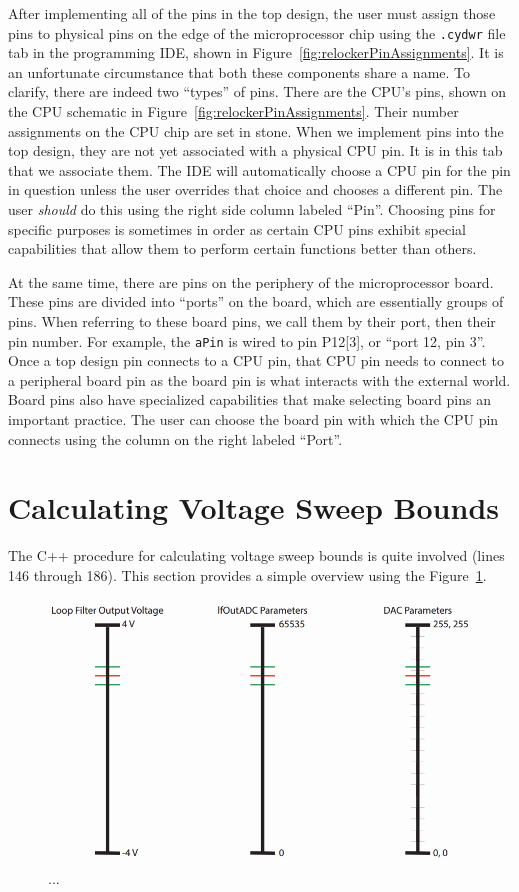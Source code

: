 \documentclass[10pt]{report}
\newcommand{\aPin}[0] {\texttt{aPin}}
\begin{document}
After implementing all of the pins in the top design, the user must assign those pins to physical pins on the edge of the microprocessor chip using the \texttt{.cydwr} file tab in the programming IDE, shown in Figure~\ref{fig:relockerPinAssignments}. It is an unfortunate circumstance that both these components share a name. To clarify, there are indeed two ``types'' of pins. There are the CPU's pins, shown on the CPU schematic in Figure~\ref{fig:relockerPinAssignments}. Their number assignments on the CPU chip are set in stone. When we implement pins into the top design, they are not yet associated with a physical CPU pin. It is in this tab that we associate them. The IDE will automatically choose a CPU pin for the pin in question unless the user overrides that choice and chooses a different pin. The user \textit{should} do this using the right side column labeled ``Pin''. Choosing pins for specific purposes is sometimes in order as certain CPU pins exhibit special capabilities that allow them to perform certain functions better than others. 

At the same time, there are pins on the periphery of the microprocessor board. These pins are divided into ``ports'' on the board, which are essentially groups of pins. When referring to these board pins, we call them by their port, then their pin number. For example, the \aPin{}  is wired to pin P12[3], or ``port 12, pin 3''. Once a top design pin connects to a CPU pin, that CPU pin needs to connect to a peripheral board pin as the board pin is what interacts with the external world. Board pins also have specialized capabilities that make selecting board pins an important practice. The user can choose the board pin with which the CPU pin connects using the column on the right labeled ``Port''.

\section{Calculating Voltage Sweep Bounds}

The C++ procedure for calculating voltage sweep bounds is quite involved (lines 146 through 186). This section provides a simple overview using the Figure~\ref{fig:voltageSweepDiagram}.

\begin{figure}[hbt]
    \centering
    \includegraphics[scale=0.5]{includes/voltageSweepDiagram.png}
    \caption{...}
    \label{fig:voltageSweepDiagram}
\end{figure}
\end{document}

